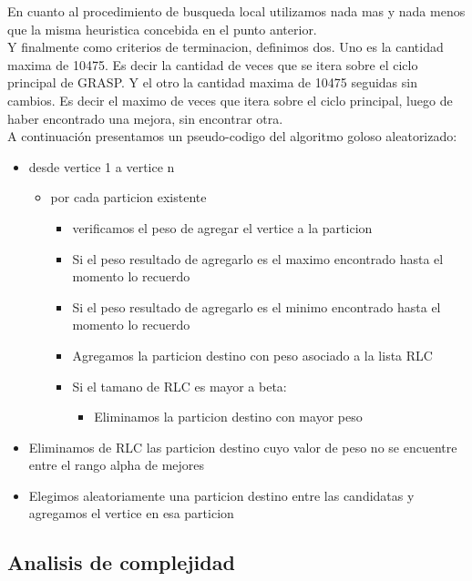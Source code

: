 En cuanto al procedimiento de busqueda local utilizamos nada mas y nada menos que la misma heuristica concebida en el punto anterior.\\

Y finalmente como criterios de terminacion, definimos dos. Uno es la cantidad maxima de 10475. Es decir la cantidad de veces que se itera sobre el ciclo principal de GRASP. Y el otro la cantidad maxima de 10475 seguidas sin cambios. Es decir el maximo de veces que itera sobre el ciclo principal, luego de haber encontrado una mejora, sin encontrar otra.\\

A continuación presentamos un pseudo-codigo del algoritmo goloso aleatorizado:\\
\begin{itemize}
\item desde vertice 1 a vertice n
    \begin{itemize}
    \item por cada particion existente
        \begin{itemize}
        \item verificamos el peso de agregar el vertice a la particion
        \item Si el peso resultado de agregarlo es el maximo encontrado hasta el momento lo recuerdo
        \item Si el peso resultado de agregarlo es el minimo encontrado hasta el momento lo recuerdo
        \item Agregamos la particion destino con peso asociado a la lista RLC
        \item Si el tamano de RLC es mayor a beta:
            \begin{itemize}
            \item Eliminamos la particion destino con mayor peso
            \end{itemize}
        \end{itemize}
    \end{itemize}
    \item Eliminamos de RLC las particion destino cuyo valor de peso no se encuentre entre el rango alpha de mejores
    \item Elegimos aleatoriamente una particion destino entre las candidatas y agregamos el vertice en esa particion 
\end{itemize}


\subsection{Analisis de complejidad}

